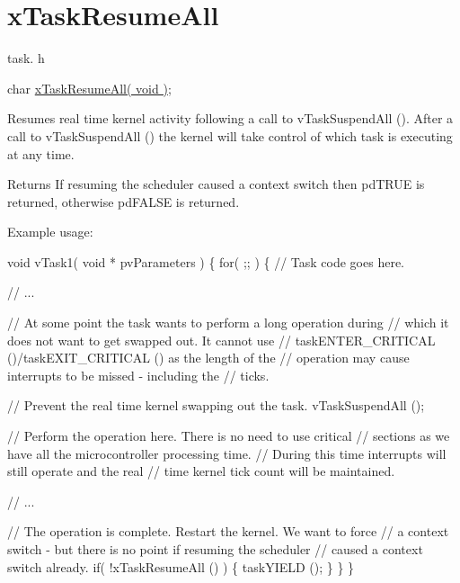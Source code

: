 \hypertarget{group__xTaskResumeAll}{}\section{x\+Task\+Resume\+All}
\label{group__xTaskResumeAll}
task. h 
\begin{DoxyPre}char \hyperlink{task_8h_afba2c0b51534051cef7f5f5c3fa804d0}{xTaskResumeAll( void )};\end{DoxyPre}


Resumes real time kernel activity following a call to v\+Task\+Suspend\+All (). After a call to v\+Task\+Suspend\+All () the kernel will take control of which task is executing at any time.

\begin{DoxyReturn}{Returns}
If resuming the scheduler caused a context switch then pd\+T\+R\+UE is returned, otherwise pd\+F\+A\+L\+SE is returned.
\end{DoxyReturn}
Example usage\+: 
\begin{DoxyPre}
void vTask1( void * pvParameters )
\{
    for( ;; )
    \{
     // Task code goes here.\end{DoxyPre}



\begin{DoxyPre}     // ...\end{DoxyPre}



\begin{DoxyPre}     // At some point the task wants to perform a long operation during
     // which it does not want to get swapped out.  It cannot use
     // taskENTER\_CRITICAL ()/taskEXIT\_CRITICAL () as the length of the
     // operation may cause interrupts to be missed - including the
     // ticks.\end{DoxyPre}



\begin{DoxyPre}     // Prevent the real time kernel swapping out the task.
     vTaskSuspendAll ();\end{DoxyPre}



\begin{DoxyPre}     // Perform the operation here.  There is no need to use critical
     // sections as we have all the microcontroller processing time.
     // During this time interrupts will still operate and the real
     // time kernel tick count will be maintained.\end{DoxyPre}



\begin{DoxyPre}     // ...\end{DoxyPre}



\begin{DoxyPre}     // The operation is complete.  Restart the kernel.  We want to force
     // a context switch - but there is no point if resuming the scheduler
     // caused a context switch already.
     if( !xTaskResumeAll () )
     \{
          taskYIELD ();
     \}
    \}
\}
  \end{DoxyPre}
 